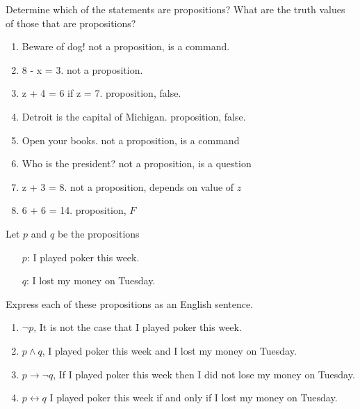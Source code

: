 \documentclass[12pt,addpoints]{exam}
\begin{document}
\extrawidth{0.5in} \extrafootheight{-0in} \pagestyle{headandfoot}
\headrule {} \footrule {}


\begin{questions}
\printanswers

\question Determine which of the statements are propositions? What are the truth values of those that are propositions?
    \ifprintanswers
        \vspace{-15pt}
    \fi
    \begin{solution}			  		 
    	\begin{enumerate}[label=(\alph*),itemsep=0pt,parsep=0pt,
    		topsep=0pt,partopsep=0pt]
        \item Beware of dog! \hfill not a proposition, is a command.
        \item 8 - x = 3. \hfill not a proposition.
        \item z + 4 = 6 if z = 7. \hfill proposition, false.
        \item Detroit is the capital of Michigan. \hfill proposition, false.
        \item Open your books. \hfill not a proposition, is a command
        \item Who is the president? \hfill not a proposition, is a question
        \item z + 3 = 8. \hfill not a proposition, depends on value of $z$
        \item 6 + 6 = 14. \hfill proposition, $F$
        \end{enumerate}
    \end{solution}


\question Let $p$ and $q$ be the propositions
 \begin{itemize}[itemsep=0pt,parsep=0pt,topsep=0pt,partopsep=0pt]
    \item[$p$:] I played poker this week.
    \item[$q$:] I lost my money on Tuesday.
 \end{itemize}
 Express each of these propositions as an English sentence.
    \ifprintanswers
        \vspace{-15pt}
    \fi
    \begin{solution}
        \begin{enumerate}[label=(\alph*),itemsep=0pt,parsep=0pt,
        topsep=0pt,partopsep=0pt]
        \item $\neg p$, It is not the case that I played poker this week.
        \item $p \wedge q$, I played poker this week and I lost my money on Tuesday.
        \item $p \rightarrow \neg q$, If I played poker this week then I did not lose my money on Tuesday.
        \item $p \leftrightarrow q$ I played poker this week if and only if I lost my money on Tuesday.
        \end{enumerate}
    \end{solution}



\end{questions}
\end{document}
